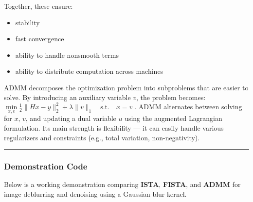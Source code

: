 \documentclass[11pt]{article}
\providecommand{\tightlist}{%
      \setlength{\itemsep}{0pt}\setlength{\parskip}{0pt}}
\begin{document}
Together, these ensure:

\begin{itemize}
\tightlist
\item
  stability
\item
  fast convergence
\item
  ability to handle nonsmooth terms
\item
  ability to distribute computation across machines
\end{itemize}

ADMM decomposes the optimization problem into subproblems that are
easier to solve. By introducing an auxiliary variable \(v\), the problem
becomes:
\(\underset{x,v}{\min} \frac{1}{2}\|Hx - y\|_2^2 + \lambda \|v\|_1 \quad \text{s.t.} \quad x = v\;\).
ADMM alternates between solving for \(x\), \(v\), and updating a dual
variable \(u\) using the augmented Lagrangian formulation. Its main
strength is flexibility --- it can easily handle various regularizers
and constraints (e.g., total variation, non-negativity).

\begin{center}\rule{0.5\linewidth}{0.5pt}\end{center}

\hypertarget{demonstration-code}{%
\subsubsection{\texorpdfstring{\textbf{Demonstration
Code}}{Demonstration Code}}\label{demonstration-code}}

Below is a working demonstration comparing \textbf{ISTA},
\textbf{FISTA}, and \textbf{ADMM} for image deblurring and denoising
using a Gaussian blur kernel.
\end{document}
